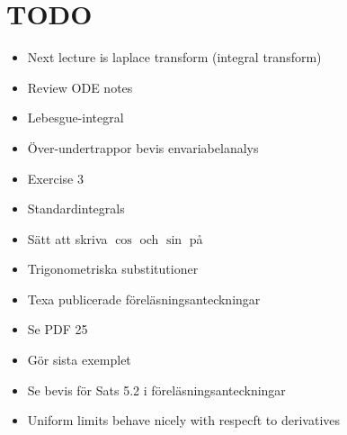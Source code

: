 \section{TODO}\par
\begin{itemize}
  \item Next lecture is laplace transform (integral transform) 
  \item Review ODE notes
  \item Lebesgue-integral
  \item Över-undertrappor bevis envariabelanalys
  \item Exercise 3
  \item Standardintegrals
  \item Sätt att skriva $\cos$ och $\sin$ på
  \item Trigonometriska substitutioner
  \item Texa publicerade föreläsningsanteckningar 
  \item Se PDF 25
  \item Gör sista exemplet
  \item Se bevis för Sats 5.2 i föreläsningsanteckningar
  \item Uniform limits behave nicely with respecft to derivatives
\end{itemize}
